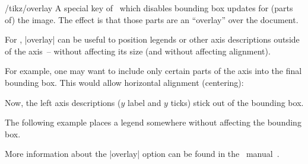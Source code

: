 \begin{key}{/tikz/overlay}
	A special key of \PGF\ which disables bounding box updates for (parts of) the image. The effect is that those parts are an ``overlay'' over the document.

	For \PGFPlots, |overlay| can be useful to position legends or other axis descriptions outside of the axis~-- without affecting its size (and without affecting alignment).

For example, one may want to include only certain parts of the axis into the final bounding box. This would allow horizontal alignment (centering):
\begin{codeexample}[]
%
\end{codeexample}
\noindent Now, the left axis descriptions ($y$ label and $y$ ticks) stick out of the bounding box.
	
The following example places a legend somewhere without affecting the bounding box.
\begin{codeexample}[]
\end{codeexample}

	More information about the |overlay| option can be found in the \PGF\ manual~\cite{tikz}.
\end{key}

